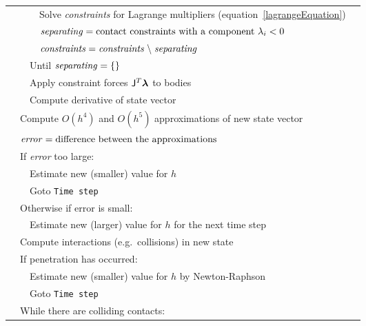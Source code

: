\begin{figure}
\begin{tabular}{|l|l|l|l|@{}l}
            &&&Solve \textit{constraints} for Lagrange multipliers (equation~\ref{lagrangeEquation})\\\cline{4-4}
            &&&$\mbox{\textit{separating}} = \mbox{contact constraints with a component } \lambda_i < 0$&
            \curly{\ref{restingContact}}{\spx\spx\spx\spx\spx\spx\spx}\\\cline{4-4}
            &&&$\mbox{\textit{constraints}} = \mbox{\textit{constraints}} \;\backslash\;
            \mbox{\textit{separating}}$\\\cline{4-4}
        &&\multicolumn{2}{|l|}{Until $\mbox{\textit{separating}} = \{\}$}\\\cline{3-4}
        &&\multicolumn{2}{|l|}{Apply constraint forces $\m{J}^T\ve{\lambda}$ to bodies}\\\cline{3-4}
        &&\multicolumn{2}{|l|}{Compute derivative of state vector}&
        \curly{\ref{rigidBodyDynamics}}{\spx}\\\cline{2-4}
    &\multicolumn{3}{|l|}{Compute $O(h^4)$ and $O(h^5)$ approximations of new state vector}\\\cline{2-4}
    &\multicolumn{3}{|l|}{$\mbox{\textit{error}} = \mbox{difference between the approximations}$}\\\cline{2-4}
    &\multicolumn{3}{|l|}{If \textit{error} too large:}\\\cline{3-4}
        &&\multicolumn{2}{|l|}{Estimate new (smaller) value for $h$}&
        \curly{\ref{solvingODEs}}{\spx\spx\spx\spx\spx\spx\spx}\\\cline{3-4}
        &&\multicolumn{2}{|l|}{Goto \texttt{Time step}}\\\cline{2-4}
    &\multicolumn{3}{|l|}{Otherwise if error is small:}\\\cline{3-4}
        &&\multicolumn{2}{|l|}{Estimate new (larger) value for $h$ for the next time step}\\\cline{2-4}
    &\multicolumn{3}{|l|}{Compute interactions (e.g.\ collisions) in new state}&
    \curly{\ref{meshIntersection}}{\spx}\\\cline{2-4}
    &\multicolumn{3}{|l|}{If penetration has occurred:}\\\cline{3-4}
        &&\multicolumn{2}{|l|}{Estimate new (smaller) value for $h$ by Newton-Raphson}&
        \curly{\ref{findingContactTime}}{\spx\spx\spx}\\\cline{3-4}
        &&\multicolumn{2}{|l|}{Goto \texttt{Time step}}\\\cline{2-4}
    &\multicolumn{3}{|l|}{While there are colliding contacts:}\\\cline{3-4}

\end{tabular}
\end{figure}
